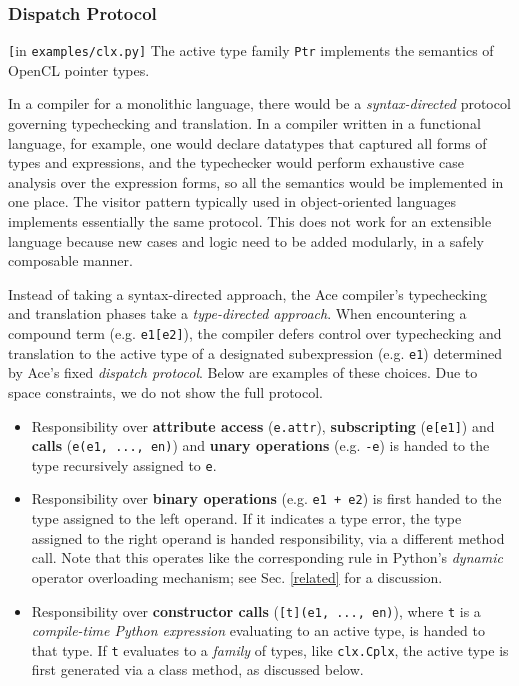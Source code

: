 \documentclass[9pt,preprint]{sigplanconf}
\begin{document}
\subsubsection{Dispatch Protocol}
\begin{codelisting}

\caption{\texttt{[}in \texttt{examples/clx.py]} The active type family \texttt{Ptr} implements the semantics of OpenCL pointer types.}
\label{cplx}
\end{codelisting}
In a compiler for a monolithic language, there would be a \emph{syntax-directed} protocol governing typechecking and translation. In a compiler written in a functional language, for example, one would declare datatypes that captured all forms of types and expressions, and the typechecker would perform exhaustive case analysis over the expression forms, so all the semantics would be implemented in one place. The visitor pattern typically used in object-oriented languages implements essentially the same protocol. This does not work for an extensible language because new cases and logic need to be added modularly, in a safely composable manner.

Instead of taking a syntax-directed approach, the Ace compiler's typechecking and translation phases take a \emph{type-directed approach}. When encountering a compound term (e.g. \verb|e1[e2]|), the compiler defers control over typechecking and translation to the active type of a designated subexpression (e.g. \verb|e1|) determined by Ace's fixed \emph{dispatch protocol}. Below are examples of these choices. Due to space constraints, we do not show the full protocol.
\begin{itemize}
\item Responsibility over {\bf attribute access} (\texttt{e.attr}), {\bf subscripting} (\texttt{e[e1]}) and \textbf{calls} (\verb|e(e1, ..., en)|) and {\bf unary operations} (e.g. \verb|-e|) is handed to the type recursively assigned to \texttt{e}.
\item Responsibility over {\bf binary operations} (e.g. \verb|e1 + e2|) is first handed to the type assigned to the left operand. If it indicates a type error, the type assigned to the right operand is handed responsibility, via a different method call. {Note that this operates like the corresponding rule in Python's \emph{dynamic} operator overloading mechanism; see Sec. \ref{related} for a discussion.}
\item Responsibility over \textbf{constructor calls} (\verb|[t](e1, ..., en)|), where \verb|t| is a \emph{compile-time Python expression} evaluating to an active type, is handed to that type. If \verb|t| evaluates to a \emph{family} of types, like \verb|clx.Cplx|, the active type is first generated via a class method, as discussed below.
\end{itemize}
\end{document}
